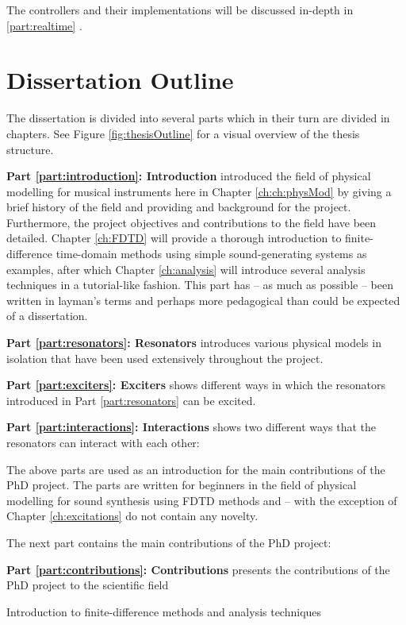 The controllers and their implementations will be discussed in-depth in \ref{part:realtime} .

\section{Dissertation Outline}
The dissertation is divided into several parts which in their turn are divided in chapters. See Figure \ref{fig:thesisOutline} for a visual overview of the thesis structure. 

\textbf{Part \ref{part:introduction}: Introduction} introduced the field of physical modelling for musical instruments here in Chapter \ref{ch:ch:physMod} by giving a brief history of the field and providing and background for the project. Furthermore, the project objectives and contributions to the field have been detailed. Chapter \ref{ch:FDTD} will provide a thorough introduction to finite-difference time-domain methods using simple sound-generating systems as examples, after which Chapter \ref{ch:analysis} will introduce several analysis techniques in a tutorial-like fashion. This part has -- as much as possible -- been written in layman's terms and perhaps more pedagogical than could be expected of a dissertation. 

\textbf{Part \ref{part:resonators}: Resonators} introduces various physical models in isolation that have been used extensively throughout the project. 

\textbf{Part \ref{part:exciters}: Exciters} shows different ways in which the resonators introduced in Part \ref{part:resonators} can be excited. 

\textbf{Part \ref{part:interactions}: Interactions} shows two different ways that the resonators can interact with each other: 

The above parts are used as an introduction for the main contributions of the PhD project. The parts are written for beginners in the field of physical modelling for sound synthesis using FDTD methods and -- with the exception of Chapter \ref{ch:excitations} do not contain any novelty. 

The next part contains the main contributions of the PhD project:

\textbf{Part \ref{part:contributions}: Contributions} presents the contributions of the PhD project to the scientific field 

Introduction to finite-difference methods and analysis techniques


